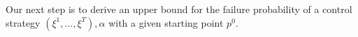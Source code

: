 
Our next step is to derive an upper bound for the failure probability of a control strategy ${(\xi^1, \dots, \xi^T), \alpha}$ with a given starting point $p^0$. 


